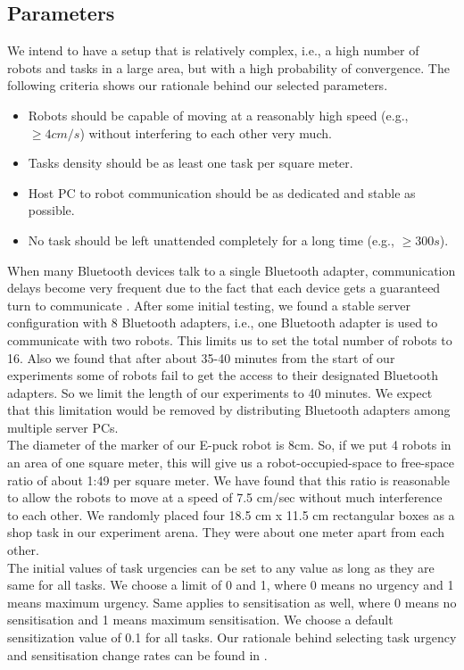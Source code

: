 \subsection{Parameters}
We intend to have a setup that is relatively complex, i.e., a high number of robots and tasks in a large area, but with a high probability of convergence. The following criteria shows our rationale behind our selected parameters.
%
\begin{itemize}
\item Robots should be capable of moving at a reasonably high speed (e.g., $\geq 4 cm/s$) without interfering to each other very much.
\item Tasks density should be as least one task per square meter.
\item Host PC to robot communication should be as dedicated and stable as possible.
\item No task should be left unattended completely for a long time (e.g., $\geq 300s $).
\end{itemize}
%
When many Bluetooth devices talk to a single Bluetooth adapter, communication delays become very frequent due to the fact that each device gets a guaranteed turn to communicate \cite{Bluetooth}. After some initial testing, we found a stable server configuration with 8 Bluetooth adapters, i.e., one Bluetooth adapter is used to communicate with two robots. This limits us to set the total number of robots to 16. Also we found that after about 35-40 minutes from the start of our experiments some of robots fail to get the access to their designated Bluetooth adapters. So we limit the length of our experiments to 40 minutes. We expect that this limitation would be removed by distributing Bluetooth adapters among multiple server PCs.\\ 
The diameter of the marker of our E-puck robot is 8cm. So, if we put 4 robots in an area of one square meter, this will give us a robot-occupied-space to free-space ratio of about 1:49 per square meter. We have found that this ratio is reasonable to allow the robots to move at a speed of 7.5 cm/sec without much interference to each other. We randomly placed four 18.5 cm x 11.5 cm rectangular boxes as a shop task in our experiment arena. They were about one meter apart from each other.\\
The initial values of task urgencies can be set to any value as long as they are same for all tasks. We choose a limit of 0 and 1, where 0 means no urgency and 1 means maximum urgency. Same applies to sensitisation as well, where 0 means no sensitisation and 1 means maximum sensitisation. We choose a default sensitization value of 0.1 for all tasks. Our rationale behind selecting task urgency and sensitisation change rates can be found in \cite{Sarker}.
